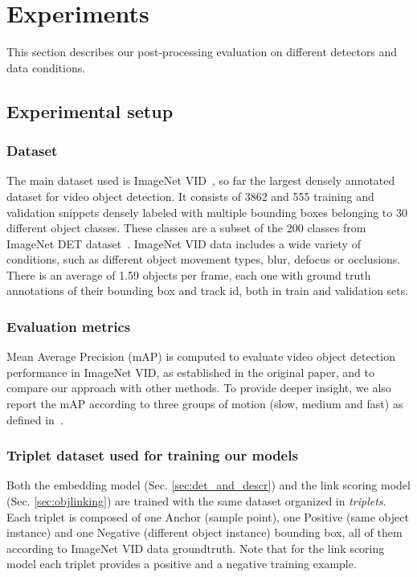 \documentclass[letterpaper, 10 pt, conference]{ieeeconf}
\begin{document}
\section{Experiments}







This section describes our post-processing evaluation on different detectors and data conditions.



\subsection{Experimental setup}
\label{sec:setup}

\subsubsection{Dataset}
\label{sec:datasets}
The main dataset used is ImageNet VID~\cite{ILSVRC15}, so far the largest densely annotated dataset for video object detection. It consists of 3862 and 555 training and validation snippets densely labeled with multiple bounding boxes belonging to 30 different object classes. These classes are a subset of the 200 classes from ImageNet DET dataset~\cite{ILSVRC15}. ImageNet VID data includes a wide variety of conditions, such as different object movement types, blur, defocus or occlusions. There is an average of 1.59 objects per frame, each one with ground truth annotations of their bounding box and track id, both in train and validation sets.

\subsubsection{Evaluation metrics}
Mean Average Precision (mAP) is computed to evaluate video object detection performance in ImageNet VID, as established in the original paper, and to compare our approach with other methods. To provide deeper insight, we also report the mAP according to three groups of motion (slow, medium and fast) as defined in~\cite{Zhu_2017_ICCV}. 


\subsubsection{Triplet dataset used for training our models}
\label{sec:triplet-dataset}

Both the embedding model (Sec. \ref{sec:det_and_descr}) and the link scoring model (Sec. \ref{sec:objlinking}) are trained with the same dataset organized in \textit{triplets}.
Each triplet is composed of one Anchor (sample point), one Positive (same object instance) and one Negative (different object instance) bounding box, 
all of them according to ImageNet VID data groundtruth. Note that for the link scoring model each triplet provides a positive and a negative training example. 
\end{document}
